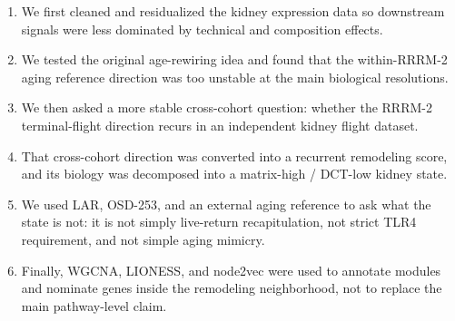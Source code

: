 \documentclass[11pt]{article}
\begin{document}
\begin{enumerate}
  \item We first cleaned and residualized the kidney expression data so downstream signals were less dominated by technical and composition effects.
  \item We tested the original age-rewiring idea and found that the within-RRRM-2 aging reference direction was too unstable at the main biological resolutions.
  \item We then asked a more stable cross-cohort question: whether the RRRM-2 terminal-flight direction recurs in an independent kidney flight dataset.
  \item That cross-cohort direction was converted into a recurrent remodeling score, and its biology was decomposed into a matrix-high / DCT-low kidney state.
  \item We used LAR, OSD-253, and an external aging reference to ask what the state is not: it is not simply live-return recapitulation, not strict TLR4 requirement, and not simple aging mimicry.
  \item Finally, WGCNA, LIONESS, and node2vec were used to annotate modules and nominate genes inside the remodeling neighborhood, not to replace the main pathway-level claim.
\end{enumerate}
\end{document}
